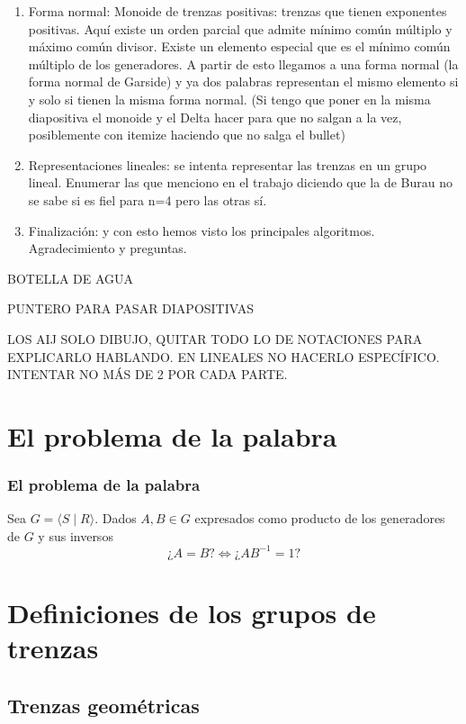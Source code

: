 \documentclass{beamer}
\theoremstyle{definition}
\providecommand{\gene}[1]{\langle{#1}\rangle}
\begin{document}
\begin{frame}
\begin{enumerate}
\conti
\item Forma normal: Monoide de trenzas positivas: trenzas que tienen exponentes positivas. Aquí existe un orden parcial que admite mínimo común múltiplo y máximo común divisor. Existe un elemento especial que es el mínimo común múltiplo de los generadores. A partir de esto llegamos a una forma normal (la forma normal de Garside) y ya dos palabras representan el mismo elemento si y solo si tienen la misma forma normal. 
(Si tengo que poner en la misma diapositiva el monoide y el Delta hacer para que no salgan a la vez, posiblemente con itemize haciendo que no salga el bullet)
\item Representaciones lineales: se intenta representar las trenzas en un grupo lineal. Enumerar las que menciono en el trabajo diciendo que la de Burau no se sabe si es fiel para n=4 pero las otras sí. 
\item Finalización: y con esto hemos visto los principales algoritmos. Agradecimiento y preguntas. 
\end{enumerate}
\end{frame}

\begin{frame}
BOTELLA DE AGUA

PUNTERO PARA PASAR DIAPOSITIVAS
\end{frame}
\begin{frame}
LOS AIJ SOLO DIBUJO, QUITAR TODO LO DE NOTACIONES PARA EXPLICARLO HABLANDO. 
EN LINEALES NO HACERLO ESPECÍFICO.
INTENTAR NO MÁS DE 2 POR CADA PARTE.


\end{frame}
\section{El problema de la palabra}

\begin{frame}
\frametitle{El problema de la palabra}
Sea $G=\gene{S\mid R}$. Dados $A,B\in G$ expresados como producto de los generadores de $G$ y sus inversos
\[
\mbox{¿}A=B?\Leftrightarrow \mbox{¿}AB^{-1}=1?
\]
\end{frame}

\section{Definiciones de los grupos de trenzas}

\subsection{Trenzas geométricas}
\end{document}
